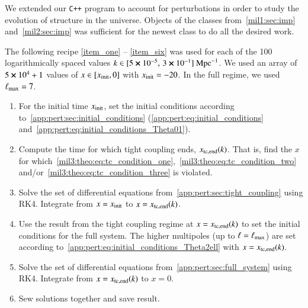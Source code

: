 


We extended our \verb|C++| program to account for perturbations in order to study the evolution of structure in the universe. Objects of the classes from~\cref{mil1:sec:imp} and~\cref{mil2:sec:imp} was sufficient for the newest class to do all the desired work. 



The following recipe \ref{item_one} -- \ref{item_six} was used for each of the 100 logarithmically spaced values $k \in [5\cross10^{-5}, \,3\cross 10^{-1}]~\mathrm{Mpc}^{-1}$. We used an array of $5\cross 10^4+1$ values of $x\in [x_\mathrm{init}, 0]$ with $x_\mathrm{init}=-20$. In the full regime, we used $\ell_\mathrm{max}=7$.

\begin{enumerate}[wide,labelwidth=!,labelindent=0pt,label=(\roman*)]
    \item\label{item_one} 
    For the initial time $x_\mathrm{init}$, set the initial conditions according to~\cref{app:pert:sec:initial_conditions} (\cref{app:pert:eq:initial_conditions} and~\eqref{app:pert:eq:initial_conditions_Theta01}). 

    \item\label{item_two} 
    
    Compute the time for which tight coupling ends, $x_\mathrm{tc,end}(k)$. That is, find the $x$ for which~\cref{mil3:theo:eq:tc_condition_one},~\eqref{mil3:theo:eq:tc_condition_two} and/or~\eqref{mil3:theo:eq:tc_condition_three} is violated. 
    
    \item\label{item_three}
    
    Solve the set of differential equations from~\cref{app:pert:sec:tight_coupling} using RK4. Integrate from $x=x_\mathrm{init}$ to $x=x_\mathrm{tc,end}(k)$.

    \item\label{item_four}
    
    Use the result from the tight coupling regime at $x=x_\mathrm{tc,end}(k)$ to set the initial conditions for the full system. The higher multipoles (up to $\ell=\ell_\mathrm{max}$) are set according to~\cref{app:pert:eq:initial_conditions_Theta2ell} with $x=x_\mathrm{tc,end}(k)$. 

    \item\label{item_five}
    
    Solve the set of differential equations from~\cref{app:pert:sec:full_system} using RK4. Integrate from $x=x_\mathrm{tc,end}(k)$ to $x=0$. 

    \item\label{item_six}
    
    Sew solutions together and save result.

\end{enumerate}

